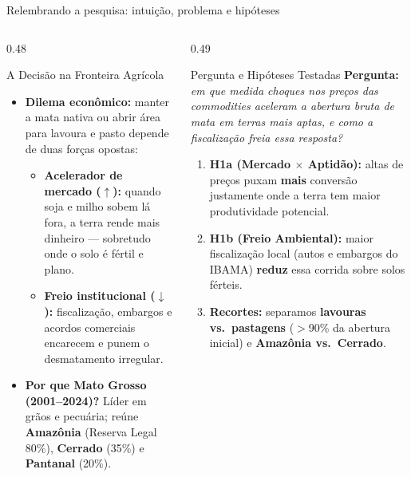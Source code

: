 \documentclass[aspectratio=169,10.5pt]{beamer}
\newcommand{\fonte}[1]{\par\vspace{1mm}{\fontsize{6.5}{7.5}\selectfont\color{gray}Fonte: #1\par}}
\begin{document}
\begin{frame}{Relembrando a pesquisa: intuição, problema e hipóteses}
\begin{columns}[T]
\begin{column}{0.48\textwidth}
\begin{block}{A Decisão na Fronteira Agrícola}
\fontsize{8}{9.6}\selectfont
\begin{itemize}
    \setlength{\itemsep}{1mm}
    \item \textbf{Dilema econômico:} manter a mata nativa ou abrir área para lavoura e pasto depende de duas forças opostas:
    \begin{itemize}
        \fontsize{7.5}{9}\selectfont
        \item \textbf{Acelerador de mercado ($\uparrow$):} quando soja e milho sobem lá fora, a terra rende mais dinheiro --- sobretudo onde o solo é fértil e plano.
        \item \textbf{Freio institucional ($\downarrow$):} fiscalização, embargos e acordos comerciais encarecem e punem o desmatamento irregular.
    \end{itemize}
    \item \textbf{Por que Mato Grosso (2001--2024)?} Líder em grãos e pecuária; reúne \textbf{Amazônia} (Reserva Legal 80\%), \textbf{Cerrado} (35\%) e \textbf{Pantanal} (20\%).
\end{itemize}
\end{block}
\end{column}

\begin{column}{0.49\textwidth}
\begin{block}{Pergunta e Hipóteses Testadas}
\fontsize{8}{9.6}\selectfont
\textbf{Pergunta:} \textit{em que medida choques nos preços das commodities aceleram a abertura bruta de mata em terras mais aptas, e como a fiscalização freia essa resposta?}
\vspace{1.2mm}
\begin{enumerate}
    \setlength{\itemsep}{1mm}
    \item \textbf{H1a (Mercado $\times$ Aptidão):} altas de preços puxam \textbf{mais} conversão justamente onde a terra tem maior produtividade potencial.
    \item \textbf{H1b (Freio Ambiental):} maior fiscalização local (autos e embargos do IBAMA) \textbf{reduz} essa corrida sobre solos férteis.
    \item \textbf{Recortes:} separamos \textbf{lavouras vs.\ pastagens} ($>$90\% da abertura inicial) e \textbf{Amazônia vs.\ Cerrado}.
\end{enumerate}
\end{block}
\end{column}
\end{columns}
\end{frame}
\end{document}
